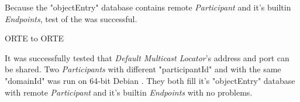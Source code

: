 Because the "objectEntry" database contains remote {\em Participant} and it's builtin {\em Endpoints}, test of the  was successful.

\sec ORTE to ORTE

It was successfully tested that {\em Default Multicast Locator}'s  address and port can be shared. Two {\em Participants} with different "participantId" and with the same "domainId" was run on 64-bit Debian . They both fill it's "objectEntry" database with remote {\em Participant} and it's builtin {\em Endpoints} with no problems.

